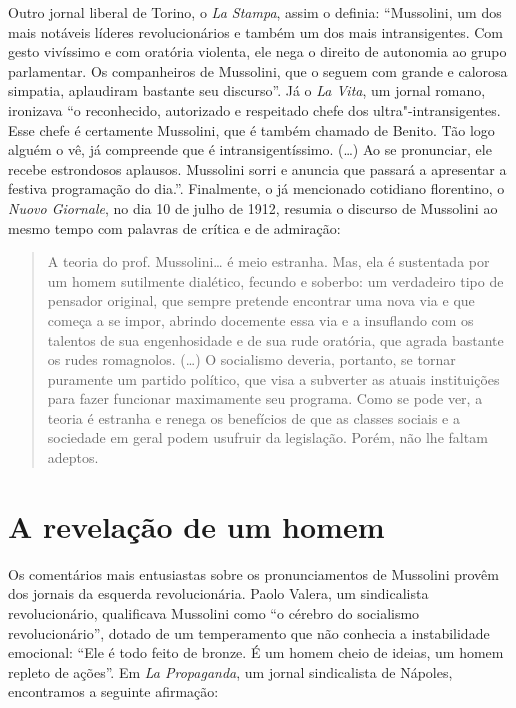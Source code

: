Outro jornal liberal de Torino, o \emph{La Stampa}, assim o definia:
``Mussolini, um dos mais notáveis líderes revolucionários e também um
dos mais intransigentes. Com gesto vivíssimo e com oratória violenta,
ele nega o direito de autonomia ao grupo parlamentar. Os companheiros de
Mussolini, que o seguem com grande e calorosa simpatia, aplaudiram
bastante seu discurso''. Já o \emph{La Vita}, um jornal romano,
ironizava ``o reconhecido, autorizado e respeitado chefe dos
ultra"-intransigentes. Esse chefe é certamente Mussolini, que é também
chamado de Benito. Tão logo alguém o vê, já compreende que é
intransigentíssimo. (\ldots{}) Ao se pronunciar, ele recebe estrondosos
aplausos. Mussolini sorri e anuncia que passará a apresentar a festiva
programação do dia.''. Finalmente, o já mencionado cotidiano florentino,
o \emph{Nuovo Giornale}, no dia 10 de julho de 1912, resumia o discurso
de Mussolini ao mesmo tempo com palavras de crítica e de admiração:

\begin{quote}
A teoria do prof. Mussolini\ldots{} é meio estranha. Mas, ela é sustentada
por um homem sutilmente dialético, fecundo e soberbo: um verdadeiro tipo
de pensador original, que sempre pretende encontrar uma nova via e que
começa a se impor, abrindo docemente essa via e a insuflando com os
talentos de sua engenhosidade e de sua rude oratória, que agrada
bastante os rudes romagnolos. (\ldots{}) O socialismo deveria, portanto, se
tornar puramente um partido político, que visa a subverter as atuais
instituições para fazer funcionar maximamente seu programa. Como se pode
ver, a teoria é estranha e renega os benefícios de que as classes
sociais e a sociedade em geral podem usufruir da legislação. Porém, não
lhe faltam adeptos.
\end{quote}

\section{A revelação de um homem}

Os comentários mais entusiastas sobre os pronunciamentos de Mussolini
provêm dos jornais da esquerda revolucionária. Paolo Valera, um
sindicalista revolucionário, qualificava Mussolini como ``o cérebro do
socialismo revolucionário'', dotado de um temperamento que não conhecia
a instabilidade emocional: ``Ele é todo feito de bronze. É um homem
cheio de ideias, um homem repleto de ações''. Em \emph{La Propaganda},
um jornal sindicalista de Nápoles, encontramos a seguinte afirmação:

